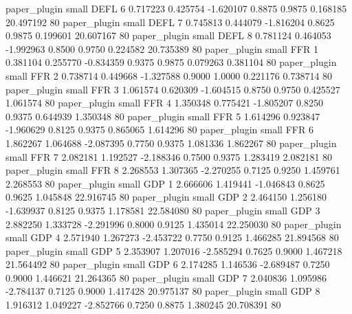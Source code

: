  paper_plugin      small     DEFL                 6 0.717223 0.425754 -1.620107 0.8875 0.9875  0.168185   20.497192 80
 paper_plugin      small     DEFL                 7 0.745813 0.444079 -1.816204 0.8625 0.9875  0.199601   20.607167 80
 paper_plugin      small     DEFL                 8 0.781124 0.464053 -1.992963 0.8500 0.9750  0.224582   20.735389 80
 paper_plugin      small      FFR                 1 0.381104 0.255770 -0.834359 0.9375 0.9875  0.079263    0.381104 80
 paper_plugin      small      FFR                 2 0.738714 0.449668 -1.327588 0.9000 1.0000  0.221176    0.738714 80
 paper_plugin      small      FFR                 3 1.061574 0.620309 -1.604515 0.8750 0.9750  0.425527    1.061574 80
 paper_plugin      small      FFR                 4 1.350348 0.775421 -1.805207 0.8250 0.9375  0.644939    1.350348 80
 paper_plugin      small      FFR                 5 1.614296 0.923847 -1.960629 0.8125 0.9375  0.865065    1.614296 80
 paper_plugin      small      FFR                 6 1.862267 1.064688 -2.087395 0.7750 0.9375  1.081336    1.862267 80
 paper_plugin      small      FFR                 7 2.082181 1.192527 -2.188346 0.7500 0.9375  1.283419    2.082181 80
 paper_plugin      small      FFR                 8 2.268553 1.307365 -2.270255 0.7125 0.9250  1.459761    2.268553 80
 paper_plugin      small      GDP                 1 2.666606 1.419441 -1.046843 0.8625 0.9625  1.045848   22.916745 80
 paper_plugin      small      GDP                 2 2.464150 1.256180 -1.639937 0.8125 0.9375  1.178581   22.584080 80
 paper_plugin      small      GDP                 3 2.882250 1.333728 -2.291996 0.8000 0.9125  1.435014   22.250030 80
 paper_plugin      small      GDP                 4 2.571940 1.267273 -2.453722 0.7750 0.9125  1.466285   21.894568 80
 paper_plugin      small      GDP                 5 2.353907 1.207016 -2.585294 0.7625 0.9000  1.467218   21.564492 80
 paper_plugin      small      GDP                 6 2.174285 1.146536 -2.689487 0.7250 0.9000  1.446621   21.264365 80
 paper_plugin      small      GDP                 7 2.040836 1.095986 -2.784137 0.7125 0.9000  1.417428   20.975137 80
 paper_plugin      small      GDP                 8 1.916312 1.049227 -2.852766 0.7250 0.8875  1.380245   20.708391 80